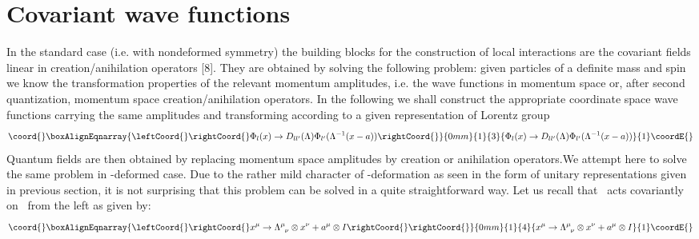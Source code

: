 \documentclass[a4paper,a4paper]{article}
\begin{document}
\section{Covariant wave functions}

In the standard case (i.e. with nondeformed symmetry) the building
blocks for the  construction of local interactions are the
covariant fields linear in creation/anihilation operators [8].
They are obtained by solving the following problem: given
particles of a definite mass and spin we know the transformation
properties of the relevant momentum amplitudes, i.e.  the wave
functions in momentum space or, after second quantization,
momentum space creation/anihilation operators. In the following
we shall construct the appropriate coordinate space wave functions
carrying the same amplitudes and transforming according to a
given representation of  Lorentz group
\begin{eqnarray}\coord{}\boxAlignEqnarray{\leftCoord{}\rightCoord{}\label{wz16}
\Phi_{l}(x)\rightarrow
D_{ll^{\prime}}(\Lambda)\Phi_{l^{\prime}}(\Lambda^{-1}(x-a))
\label{w9} 
\rightCoord{}}{0mm}{1}{3}{\Phi_{l}(x)\rightarrow
D_{ll^{\prime}}(\Lambda)\Phi_{l^{\prime}}(\Lambda^{-1}(x-a))
}{1}\coordE{}\end{eqnarray}
Quantum fields are then obtained by replacing momentum space
amplitudes by creation or anihilation operators.\newline We
attempt here to solve the same problem in \myHighlight{$\kappa$}\coordHE{}-deformed case.
Due to the rather mild character of \myHighlight{$\kappa$}\coordHE{}-deformation as seen
in  the form of unitary representations given in previous section,
it is not surprising that this
problem can be solved in a quite straightforward way. Let us  recall
that \coordHE{}\ acts covariantly
on \coordHE{}\ from the left as given
by:
\renewcommand{\theequation}{17\alph{equation}}
\setcounter{equation}{0}
\begin{eqnarray}\coord{}\boxAlignEqnarray{\leftCoord{}\rightCoord{}\label{wz17}
x^{\mu}\rightarrow \Lambda^{\mu}_{\;\;\nu}\otimes
x^{\nu}+a^{\mu}\otimes I \rightCoord{}
\label{w10}  
\rightCoord{}}{0mm}{1}{4}{x^{\mu}\rightarrow \Lambda^{\mu}_{\;\;\nu}\otimes
x^{\nu}+a^{\mu}\otimes I 
}{1}\coordE{}\end{eqnarray}
\end{document}
